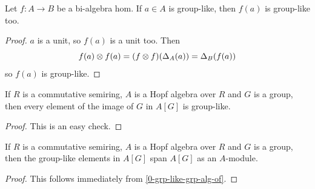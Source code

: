 \begin{lemma}
  \label{0-grp-like-map}
  \leanok

  Let $f : A \to B$ be a bi-algebra hom. If $a \in A$ is group-like, then $f(a)$ is group-like too.
\end{lemma}
\begin{proof}
  \uses{}
  \leanok

  $a$ is a unit, so $f(a)$ is a unit too. Then
  \[
    f(a) \otimes f(a) = (f \otimes f)(\Delta_A(a)) = \Delta_B(f(a))
  \]
  so $f(a)$ is group-like.
\end{proof}


\begin{lemma}
  \label{0-grp-like-grp-alg-of}
  \leanok

  If $R$ is a commutative semiring, $A$ is a Hopf algebra over $R$ and
  $G$ is a group, then every element of the image of $G$ in $A[G]$ is group-like.
\end{lemma}
\begin{proof}
  \uses{}
  \leanok

  This is an easy check.
\end{proof}


\begin{lemma}
  \label{0-grp-like-grp-alg-span}
  \leanok

  If $R$ is a commutative semiring, $A$ is a Hopf algebra over $R$ and
  $G$ is a group, then the group-like elements in $A[G]$ span $A[G]$ as
  an $A$-module.

\end{lemma}
\begin{proof}
  \leanok

  This follows immediately from \ref{0-grp-like-grp-alg-of}.
\end{proof}


